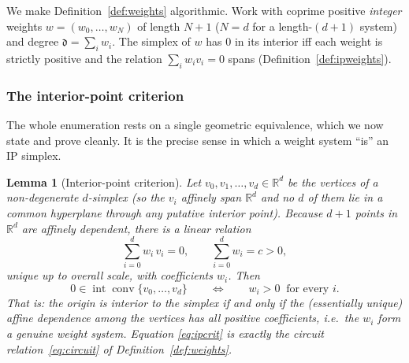 \documentclass{amsart}
\newtheorem{lemma}[theorem]{Lemma}
\begin{document}
We make Definition~\ref{def:weights} algorithmic. Work with coprime
positive \emph{integer} weights $w=(w_0,\dots,w_N)$ of length $N{+}1$
($N = d$ for a length-$(d{+}1)$ system) and degree
$\mathfrak{d} = \sum_i w_i$. The simplex of $w$ has $0$ in its interior iff
each weight is strictly positive and the relation $\sum_i w_i v_i = 0$
spans (Definition~\ref{def:ipweights}).

\subsubsection*{The interior-point criterion}

The whole enumeration rests on a single geometric equivalence, which we now
state and prove cleanly. It is the precise sense in which a weight system
``is'' an IP simplex.

\begin{lemma}[Interior-point criterion]\label{lem:ipcrit}
Let $v_0,v_1,\dots,v_d \in \mathbb{R}^d$ be the vertices of a non-degenerate
$d$-simplex (so the $v_i$ affinely span $\mathbb{R}^d$ and no $d$ of them lie
in a common hyperplane through any putative interior point). Because $d{+}1$
points in $\mathbb{R}^d$ are affinely dependent, there is a linear relation
\begin{equation}\label{eq:ipcrit}
  \sum_{i=0}^{d} w_i\, v_i = 0,
  \qquad \sum_{i=0}^{d} w_i = c > 0,
\end{equation}
unique up to overall scale, with coefficients $w_i$. Then
\[
  0 \in \operatorname{int}\operatorname{conv}\{v_0,\dots,v_d\}
  \qquad\Longleftrightarrow\qquad
  w_i > 0 \ \text{ for every } i .
\]
That is: the origin is interior to the simplex if and only if the (essentially
unique) affine dependence among the vertices has \emph{all positive}
coefficients, i.e.\ the $w_i$ form a genuine weight system. Equation
\eqref{eq:ipcrit} is exactly the circuit relation~\eqref{eq:circuit}
of Definition~\ref{def:weights}.
\end{lemma}
\end{document}
